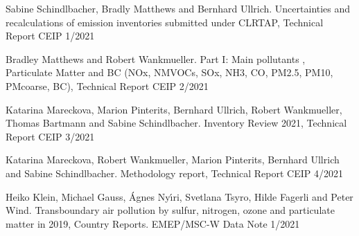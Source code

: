 \enlargethispage{\baselineskip}
\begin{list}{}{\setlength{\leftmargin}{15pt}\setlength{\itemindent}{-\leftmargin}}\small

\item[]  
Sabine Schindlbacher, Bradly Matthews and Bernhard Ullrich. Uncertainties and recalculations of emission inventories submitted under CLRTAP, Technical Report CEIP 1/2021

\item[]
Bradley Matthews and Robert Wankmueller. Part I:  Main pollutants , Particulate Matter and BC (NOx, NMVOCs, SOx, NH3, CO, PM2.5, PM10, PMcoarse, BC), Technical Report CEIP 2/2021

\item[]
 Katarina Mareckova, Marion Pinterits, Bernhard Ullrich,  Robert Wankmueller, Thomas Bartmann and Sabine Schindlbacher. Inventory Review 2021,  Technical Report CEIP 3/2021
  
\item[]
Katarina Mareckova, Robert Wankmueller, Marion Pinterits, Bernhard Ullrich and Sabine Schindlbacher. Methodology report, Technical Report CEIP 4/2021

\end{list}



 \enlargethispage{\baselineskip}
 \begin{list}{}{\setlength{\leftmargin}{15pt}\setlength{\itemindent}{-\leftmargin}}\small

 \item[]
 Heiko Klein, Michael Gauss, \'Agnes  Ny\'{\i}ri, Svetlana Tsyro, Hilde Fagerli and Peter Wind. 
Transboundary air pollution by sulfur, nitrogen, ozone and particulate matter in 2019, Country Reports. EMEP/MSC-W Data Note 1/2021


 \end{list}







\newpage
\renewcommand\bibname{References}      %
%

